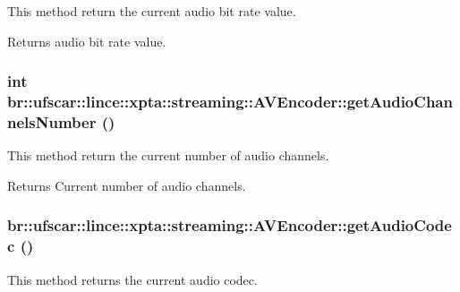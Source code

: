 This method return the current audio bit rate value. 

\begin{DoxyReturn}{Returns}
audio bit rate value. 
\end{DoxyReturn}
\hypertarget{classbr_1_1ufscar_1_1lince_1_1xpta_1_1streaming_1_1AVEncoder_af32b48a3bb42e7e95b5c389fd61d6ce1}{
\subsubsection[{getAudioChannelsNumber}]{\setlength{\rightskip}{0pt plus 5cm}int br::ufscar::lince::xpta::streaming::AVEncoder::getAudioChannelsNumber ()}}
\label{classbr_1_1ufscar_1_1lince_1_1xpta_1_1streaming_1_1AVEncoder_af32b48a3bb42e7e95b5c389fd61d6ce1}


This method return the current number of audio channels. 

\begin{DoxyReturn}{Returns}
Current number of audio channels. 
\end{DoxyReturn}
\hypertarget{classbr_1_1ufscar_1_1lince_1_1xpta_1_1streaming_1_1AVEncoder_a21a3ce2125b5df0e3d7a8a47df6e5012}{
\subsubsection[{getAudioCodec}]{ br::ufscar::lince::xpta::streaming::AVEncoder::getAudioCodec ()}}
\label{classbr_1_1ufscar_1_1lince_1_1xpta_1_1streaming_1_1AVEncoder_a21a3ce2125b5df0e3d7a8a47df6e5012}


This method returns the current audio codec. 

